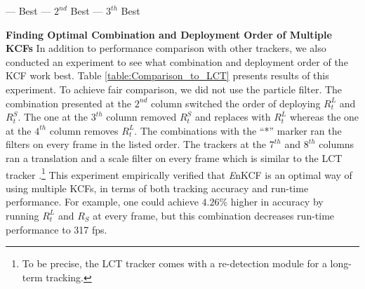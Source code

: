 \documentclass[10pt,twocolumn,letterpaper]{article}
\begin{document}
\begin{table}[!h]
\smaller
\begin{center}
\color{green}--- Best \hspace{.15\linewidth}\color{red}--- $2^{nd}$ Best \hspace{.15\linewidth}\color{blue}--- $3^{th}$ Best \color{black}\\
\end{center}
\caption{Results of running different combinations of the KCFs for
  UAV123 dataset. The '$*$' represents a sequential approach where
  multiple KCFs are, in the given order, applied to every frame like
  in LCT \cite{ma2015long}.}
\label{table:Comparison_to_LCT}
\end{table}

\textbf{Finding Optimal Combination and Deployment Order of Multiple
  KCFs} In addition to performance comparison with other trackers, we
also conducted an experiment to see what combination and deployment
order of the KCF work best. Table \ref{table:Comparison_to_LCT}
presents results of this experiment. To achieve fair comparison, we did
not use the particle filter. The combination presented at the $2^{nd}$
column switched the order of deploying $R_{t}^{L}$ and
$R_{t}^{S}$. The one at the $3^{th}$ column removed $R_{t}^{S}$ and
replaces with $R_{t}^{L}$ whereas the one at the $4^{th}$ column
removes $R_{t}^{L}$. The combinations with the ``*'' marker ran the
filters on every frame in the listed order. The trackers at the
$7^{th}$ and $8^{th}$ columns ran a translation and a scale filter on
every frame which is similar to the LCT tracker
\cite{ma2015long}.\footnote{To be precise, the LCT tracker comes with
  a re-detection module for a long-term tracking.} This experiment
empirically verified that \textit{E}nKCF is an optimal way of using
multiple KCFs, in terms of both tracking accuracy and run-time
performance. For example, one could achieve $4.26\%$ higher in accuracy
by running $R_{t}^{L}$ and $R_{S}$ at every frame, but this
combination decreases run-time performance to 317 fps. 
\end{document}
